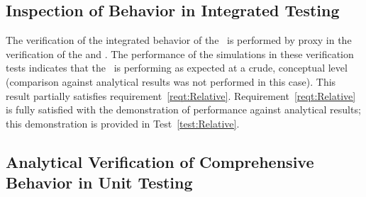 %
%
% 
%


\subsection{Inspection of Behavior in Integrated Testing}
\label{inspect:Relative}
  The verification of the integrated behavior of the \RelativeDesc\ is performed by proxy in the verification of the  and .  The performance of the simulations in these verification tests indicates that the \RelativeDesc\ is performing as expected at a crude, conceptual level (comparison against analytical results was not performed in this case). This result partially satisfies requirement~\ref{reqt:Relative}.  Requirement~\ref{reqt:Relative} is fully satisfied with the demonstration of performance against analytical results; this demonstration is provided in Test~\ref{test:Relative}. 


\subsection{Analytical Verification of Comprehensive Behavior in Unit Testing}

\label{test:Relative}

